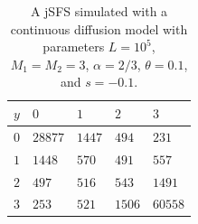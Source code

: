 \documentclass[preprint]{elsarticle}
\newcommand\ie{{\it i.e.,}}
\newcommand\x[1]{\ensuremath{X_{#1}}}
\begin{document}
{\begin{table}[ht]
\centering
\caption{A jSFS simulated with a continuous diffusion model with parameters $L=10^5$, $M_1=M_2=3$, $\alpha=2/3$, $\theta=0.1$, and $s=-0.1$.}
  \begin{tabular}{lllll}
  \toprule
    $y$&$0$&$1$&$2$&$3$\\
    \midrule
    $0$  &$28877$ &$1447$ &$494$  &$231$\\
    $1$  &$1448$  &$570$  &$491$  &$557$\\
    $2$  &$497$   &$516$  &$543$  &$1491$\\
    $3$  &$253$   &$521$  &$1506$ &$60558$\\
    \bottomrule
  \end{tabular}\label{jointSFScont}
\end{table}





}
\end{document}
